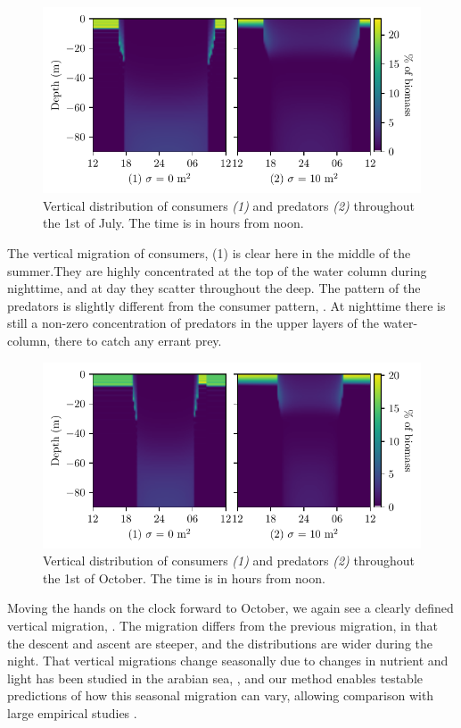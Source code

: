\begin{figure}[H]
\includegraphics{plots/heatmapsday90_nonrandom.pdf}
\caption{Vertical distribution of consumers \emph{(1)} and predators \emph{(2)} throughout the 1st of July. The time is in hours from noon. }
\label{fig:heatmaps_90_nonrandom}
\end{figure}
The vertical migration of consumers, (1) is clear here in the middle of the summer.They are highly concentrated at the top of the water column during nighttime, and at day they scatter throughout the deep. The pattern of the predators is slightly different from the consumer pattern, . At nighttime there is still a non-zero concentration of predators in the upper layers of the water-column, there to catch any errant prey.
\begin{figure}[H]
\includegraphics{plots/heatmapsday180_nonrandom.pdf}
\caption{Vertical distribution of consumers \emph{(1)} and predators \emph{(2)} throughout the 1st of October. The time is in hours from noon.}
\label{fig:heatmaps_180_nonrandom}
\end{figure}
Moving the hands on the clock forward to October, we again see a clearly defined vertical migration, . The migration differs from the previous migration, in that the descent and ascent are steeper, and the distributions are wider during the night. That vertical migrations change seasonally due to changes in nutrient and light has been studied in the arabian sea, \citep{wang2014seasonal}, and our method enables testable predictions of how this seasonal migration can vary, allowing comparison with large empirical studies \citep{klevjer2016large}.

